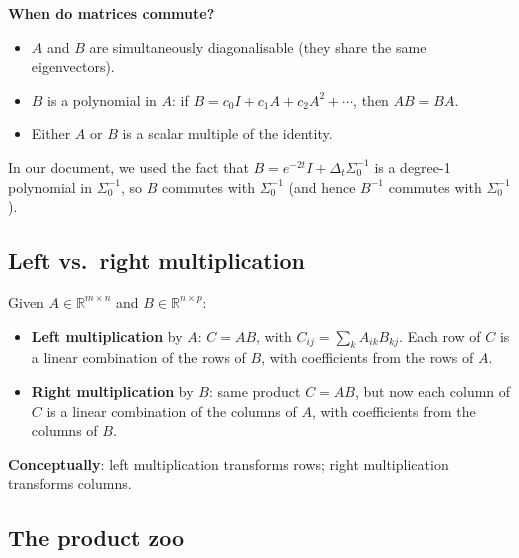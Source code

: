 \documentclass[11pt,a4paper]{article}
\newcommand{\R}{\mathbb{R}}
\newcommand{\Dt}{\Delta_t}
\begin{document}
\textbf{When do matrices commute?}
\begin{itemize}[nosep]
  \item $A$ and $B$ are simultaneously diagonalisable (they share the same eigenvectors).
  \item $B$ is a polynomial in $A$: if $B = c_0 I + c_1 A + c_2 A^2 + \cdots$, then $AB = BA$.
  \item Either $A$ or $B$ is a scalar multiple of the identity.
\end{itemize}

In our document, we used the fact that $B = e^{-2t}I + \Dt\Sigma_0^{-1}$ is a degree-1 polynomial in $\Sigma_0^{-1}$, so $B$ commutes with $\Sigma_0^{-1}$ (and hence $B^{-1}$ commutes with $\Sigma_0^{-1}$).

\subsection{Left vs.\ right multiplication}

Given $A \in \R^{m \times n}$ and $B \in \R^{n \times p}$:
\begin{itemize}[nosep]
  \item \textbf{Left multiplication} by $A$: $C = AB$, with $C_{ij} = \sum_k A_{ik}B_{kj}$.  Each row of $C$ is a linear combination of the rows of $B$, with coefficients from the rows of $A$.
  \item \textbf{Right multiplication} by $B$: same product $C = AB$, but now each column of $C$ is a linear combination of the columns of $A$, with coefficients from the columns of $B$.
\end{itemize}

\textbf{Conceptually}: left multiplication transforms rows; right multiplication transforms columns.

\subsection{The product zoo}
\end{document}
